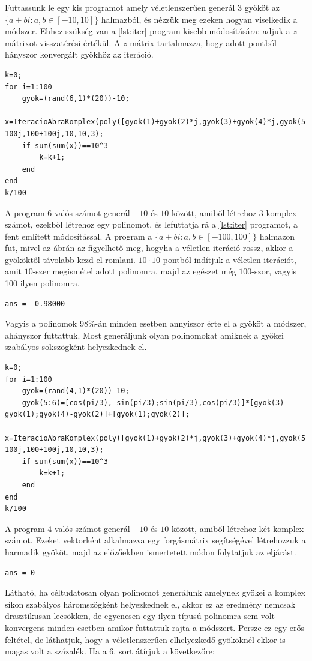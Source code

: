 \documentclass[a4paper,12pt]{report}
\begin{document}
Futtassunk le egy kis programot amely véletlenszerűen generál 3 gyököt az $\{ a+bi : a,b \in [-10,10]\}$ halmazból, és nézzük meg ezeken hogyan viselkedik a módszer. Ehhez szükség van a \ref{lst:iter} program kisebb módosítására: adjuk a $z$ mátrixot visszatérési értékül. A $z$ mátrix tartalmazza, hogy adott pontból hányszor konvergált gyökhöz az iteráció.
                \begin{lstlisting}[caption=Bemenet,label=lst:szabalyos]
k=0;
for i=1:100
    gyok=(rand(6,1)*(20))-10;
    x=IteracioAbraKomplex(poly([gyok(1)+gyok(2)*j,gyok(3)+gyok(4)*j,gyok(5)+gyok(6)*j]),-100-100j,100+100j,10,10,3);
    if sum(sum(x))==10^3
        k=k+1;
    end
end
k/100
                \end{lstlisting}
A program $6$ valós számot generál $-10$ és $10$ között, amiből létrehoz $3$ komplex számot, ezekből létrehoz egy polinomot, és lefuttatja rá a \ref{lst:iter} programot, a fent említett módosítással. A program a $\{a+bi:a,b\in[-100,100]\}$ halmazon fut, mivel az ábrán az figyelhető meg, hogyha a véletlen iteráció rossz, akkor a gyököktől távolabb kezd el romlani. $10\cdot 10$ pontból indítjuk a véletlen iterációt, amit $10$-szer megismétel adott polinomra, majd az egészet még $100$-szor, vagyis 100 ilyen polinomra.
                \begin{lstlisting}[caption=Eredm\'eny]
ans =  0.98000
                \end{lstlisting}
Vagyis a polinomok 98\%-án minden esetben annyiszor érte el a gyököt a módszer, ahányszor futtattuk. Most generáljunk olyan polinomokat amiknek a gyökei szabályos sokszögként helyezkednek el.
                \begin{lstlisting}[caption=Bemenet]
k=0;
for i=1:100
    gyok=(rand(4,1)*(20))-10;
    gyok(5:6)=[cos(pi/3),-sin(pi/3);sin(pi/3),cos(pi/3)]*[gyok(3)-gyok(1);gyok(4)-gyok(2)]+[gyok(1);gyok(2)];
    x=IteracioAbraKomplex(poly([gyok(1)+gyok(2)*j,gyok(3)+gyok(4)*j,gyok(5)+gyok(6)*j]),-100-100j,100+100j,10,10,3);
    if sum(sum(x))==10^3
        k=k+1;
    end
end
k/100
                \end{lstlisting}
A program $4$ valós számot generál $-10$ és $10$ között, amiből létrehoz két komplex számot. Ezeket vektorként alkalmazva egy forgásmátrix segítségével létrehozzuk a harmadik gyököt, majd az előzőekben ismertetett módon folytatjuk az eljárást.
                \begin{lstlisting}[caption=Eredm\'eny]
ans = 0
                \end{lstlisting}
Látható, ha céltudatosan olyan polinomot generálunk amelynek gyökei a komplex síkon szabályos háromszögként helyezkednek el, akkor ez az eredmény nemcsak drasztikusan lecsökken, de egyenesen egy ilyen típusú polinomra sem volt konvergens minden esetben amikor futtattuk rajta a módszert. Persze ez egy erős feltétel, de láthatjuk, hogy a véletlenszerűen elhelyezkedő gyököknél ekkor is magas volt a százalék. Ha a 6. sort átírjuk a következőre: 
\end{document}
